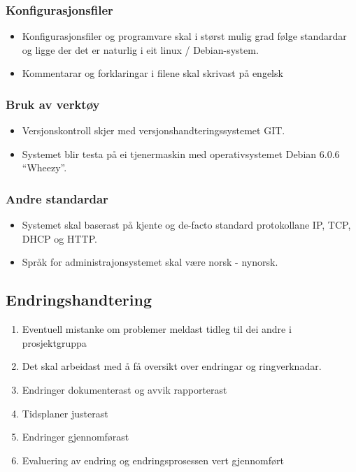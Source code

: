 \documentclass[nynorsk,12pt,a4paper]{article}
\begin{document}
\subsubsection{Konfigurasjonsfiler}
\begin{itemize}
	\item Konfigurasjonsfiler og programvare skal i størst mulig grad følge standardar og ligge der det er naturlig i eit linux / Debian{}-system.
	\item Kommentarar og forklaringar i filene skal skrivast på engelsk
\end{itemize}

\subsubsection{Bruk av verktøy}
\begin{itemize}
	\item Versjonskontroll skjer med versjonshandteringssystemet GIT. 
	\item Systemet blir testa på ei tjenermaskin med operativsystemet Debian 6.0.6 “Wheezy”. 
\end{itemize}
\subsubsection{Andre standardar}
\begin{itemize}
	\item Systemet skal baserast på kjente og de{}-facto standard protokollane IP, TCP, DHCP og HTTP.
	\item Språk for administrajonsystemet skal være norsk - nynorsk.
\end{itemize}

\subsection{Endringshandtering}
\begin{enumerate}
	\item Eventuell mistanke om problemer meldast tidleg til dei andre i prosjektgruppa
	\item Det skal arbeidast med å få oversikt over endringar og ringverknadar.
	\item Endringer dokumenterast og avvik rapporterast
	\item Tidsplaner justerast
	\item Endringer gjennomførast
	\item Evaluering av endring og endringsprosessen vert gjennomført
\end{enumerate}
\end{document}
